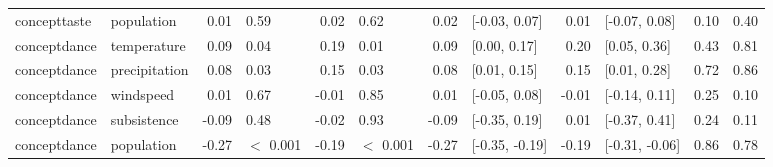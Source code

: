 \begin{table}[ht]
\begin{tabular}{llrlrlrlrlrr}
  concepttaste & population & 0.01 & 0.59 & 0.02 & 0.62 & 0.02 & [-0.03, 0.07] & 0.01 & [-0.07, 0.08] & 0.10 & 0.40 \\ 
  conceptdance & temperature & 0.09 & 0.04 & 0.19 & 0.01 & 0.09 & [0.00, 0.17] & 0.20 & [0.05, 0.36] & 0.43 & 0.81 \\ 
  conceptdance & precipitation & 0.08 & 0.03 & 0.15 & 0.03 & 0.08 & [0.01, 0.15] & 0.15 & [0.01, 0.28] & 0.72 & 0.86 \\ 
  conceptdance & windspeed & 0.01 & 0.67 & -0.01 & 0.85 & 0.01 & [-0.05, 0.08] & -0.01 & [-0.14, 0.11] & 0.25 & 0.10 \\ 
  conceptdance & subsistence & -0.09 & 0.48 & -0.02 & 0.93 & -0.09 & [-0.35, 0.19] & 0.01 & [-0.37, 0.41] & 0.24 & 0.11 \\ 
  conceptdance & population & -0.27 & $<$ 0.001 & -0.19 & $<$ 0.001 & -0.27 & [-0.35, -0.19] & -0.19 & [-0.31, -0.06] & 0.86 & 0.78 \\ 
   \hline
\end{tabular}
\end{table}
